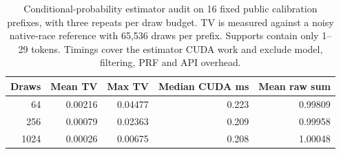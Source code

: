 \begin{table}[ht]\centering\small
\begin{tabular}{rrrrr}\toprule
Draws & Mean TV & Max TV & Median CUDA ms & Mean raw sum\\\midrule
64 & 0.00216 & 0.04477 & 0.223 & 0.99809 \\
256 & 0.00079 & 0.02363 & 0.209 & 0.99958 \\
1024 & 0.00026 & 0.00675 & 0.208 & 1.00048 \\
\bottomrule\end{tabular}
\caption{Conditional-probability estimator audit on 16 fixed public calibration prefixes, with three repeats per draw budget. TV is measured against a noisy native-race reference with 65,536 draws per prefix. Supports contain only 1--29 tokens. Timings cover the estimator CUDA work and exclude model, filtering, PRF and API overhead.}\end{table}
